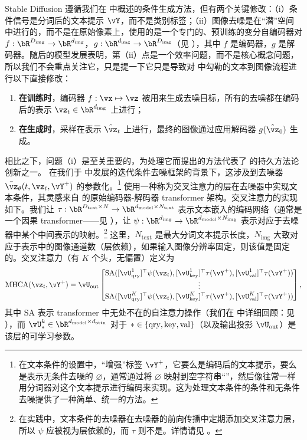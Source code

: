 \documentclass[../../book-main_zh.tex]{subfiles}
\begin{document}
Stable Diffusion 遵循我们在  中概述的条件生成方法，但有两个关键修改：（i）条件信号是分词后的文本提示 $\vY$，而不是类别标签；（ii）图像去噪是在“潜”空间中进行的，而不是在原始像素上，使用的是一个专门的、预训练的变分自编码器对 $f : \bR^{D_{\mathrm{img}}} \to \bR^{d_{\mathrm{img}}}$，$g : \bR^{d_{\mathrm{img}}} \to \bR^{D_{\mathrm{img}}}$（见 ），其中 $f$ 是编码器，$g$ 是解码器。随后的模型发展表明，第（ii）点是一个效率问题，而不是核心概念问题，所以我们不会重点关注它，只是提一下它只是导致对  中勾勒的文本到图像流程进行以下直接修改：
\begin{enumerate}
  \item \textbf{在训练时}，编码器 $f : \vx \mapsto \vz$ 被用来生成去噪目标，所有的去噪都在编码后的表示 $\vz_t \in \bR^{d_{\mathrm{img}}}$ 上进行；
  \item \textbf{在生成时}，采样在表示 $\hat{\vz}_t$ 上进行，最终的图像通过应用解码器 $g(\hat{\vz}_0)$ 生成。
\end{enumerate}
相比之下，问题（i）是至关重要的，为处理它而提出的方法代表了 \textcite{rombach2022high} 的持久方法论创新之一。
在我们于  中发展的迭代条件去噪框架的背景下，这涉及到去噪器 $\bar{\vz}_{\theta}(t, \vz_t, \vY^+)$ 的参数化。\footnote{在文本条件的设置中，“增强”标签 $\vY^+$，它要么是编码后的文本提示，要么是表示无条件去噪的 $\varnothing$，通常通过将 $\varnothing$ 映射到空字符串“”，然后像往常一样用分词器对这个文本提示进行编码来实现。这为处理文本条件的条件和无条件去噪提供了一种简单、统一的方法。}
\textcite{rombach2022high} 使用一种称为交叉注意力的层在去噪器中实现文本条件，其灵感来自 \textcite{vaswani2017attention} 的原始编码器-解码器 transformer 架构。交叉注意力的实现如下。我们让 $\tau : \bR^{D_{\mathrm{text}} \times N} \to \bR^{d_{\mathrm{model}} \times N_{\mathrm{text}}}$ 表示文本嵌入的编码网络（通常是一个因果 transformer——见 ），让 $\psi : \bR^{d_{\mathrm{img}}} \to \bR^{d_{\mathrm{model}} \times N_{\mathrm{img}}}$ 表示对应于去噪器中某个中间表示的映射。\footnote{在实践中，文本条件的去噪器在去噪器的前向传播中定期添加交叉注意力层，所以 $\psi$ 应被视为层依赖的，而 $\tau$ 则不是。详情请见 \textcite{rombach2022high}。} 这里，$N_{\mathrm{text}}$ 是最大分词文本提示长度，$N_{\mathrm{img}}$ 大致对应于表示中的图像通道数（层依赖），如果输入图像分辨率固定，则该值是固定的。交叉注意力（有 $K$ 个头，无偏置）定义为
    \begin{equation}
      \mathrm{MHCA}(\vz_t, \vY^+) \label{eq:mhca}
        = \vU_{\out}\mat{\SA([\vU_{\query}^{1}]^{\top}\psi(\vz_t),
        [\vU_{\rm key}^{1}]^{\top}\tau(\vY^+), [\vU_{\val}^{1}]^{\top}\tau(\vY^+)) \\ \vdots \\
        \SA([\vU_{\query}^{K}]^{\top}\psi(\vz_t),
        [\vU_{\rm key}^{K}]^{\top}\tau(\vY^+),
        [\vU_{\val}^{K}]^{\top}\tau(\vY^+))},
    \end{equation}
其中 $\mathrm{SA}$ 表示 transformer 中无处不在的自注意力操作（我们在  中详细回顾：见 ），而 $\vU_{*}^{k} \in \bR^{d_{\mathrm{model}}\times d_{\mathrm{attn}} }$ 对于 $* \in \set{\mathrm{qry}, \mathrm{key}, \mathrm{val}}$（以及输出投影 $\vU_{\mathrm{out}}$）是该层的可学习参数。
\end{document}
